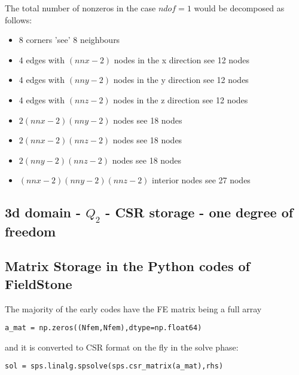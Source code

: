 \begin{center}

\end{center}



The total number of nonzeros in the case $ndof=1$ would be decomposed as follows:
\begin{itemize}
\item 8 corners 'see' 8 neighbours
\item 4 edges with $(nnx-2)$ nodes in the x direction see 12 nodes
\item 4 edges with $(nny-2)$ nodes in the y direction see 12 nodes
\item 4 edges with $(nnz-2)$ nodes in the z direction see 12 nodes
\item $2(nnx-2)(nny-2)$ nodes see 18 nodes
\item $2(nnx-2)(nnz-2)$ nodes see 18 nodes
\item $2(nny-2)(nnz-2)$ nodes see 18 nodes
\item $(nnx-2)(nny-2)(nnz-2)$ interior nodes see 27 nodes
\end{itemize}

\subsection{3d domain - $Q_2$ - CSR storage - one degree of freedom}


\begin{center}

\end{center}





\subsection{Matrix Storage in the Python codes of FieldStone}

The majority of the early codes have the FE matrix being a full array
\begin{lstlisting}
a_mat = np.zeros((Nfem,Nfem),dtype=np.float64) 
\end{lstlisting}
and it is converted to CSR format on the fly in the solve phase:
\begin{lstlisting}
sol = sps.linalg.spsolve(sps.csr_matrix(a_mat),rhs)
\end{lstlisting}


